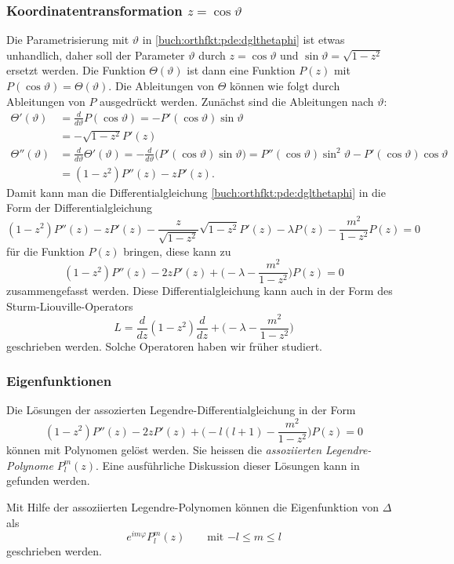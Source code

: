 \subsubsection{Koordinatentransformation $z=\cos\vartheta$}
Die Parametrisierung mit $\vartheta$
in \eqref{buch:orthfkt:pde:dglthetaphi}
ist etwas unhandlich, daher soll der Parameter
$\vartheta$ durch $z=\cos\vartheta$ und
$\sin\vartheta = \!\sqrt{1-z^2}$
ersetzt werden.
Die Funktion $\Theta(\vartheta)$ ist dann eine Funktion $P(z)$ mit
$P(\cos\vartheta)=\Theta(\vartheta)$.
Die Ableitungen von $\Theta$ können wie folgt
durch Ableitungen von $P$ ausgedrückt werden.
Zunächst sind die Ableitungen nach $\vartheta$:
\begin{align*}
\Theta'(\vartheta)
&=
\frac{d}{d\vartheta} P(\cos\vartheta)
=
-P'(\cos\vartheta) \sin\vartheta
\\
&=
-
\!\sqrt{1-z^2}
P'(z)
\\
\Theta''(\vartheta)
&=
\frac{d}{d\vartheta} 
\Theta'(\vartheta)
=
-\frac{d}{d\vartheta}\bigl(P'(\cos\vartheta) \sin\vartheta\bigr)
=
P''(\cos\vartheta)\sin^2\vartheta
-
P'(\cos\vartheta)\cos\vartheta
\\
&=
(1-z^2)
P''(z)
-
z
P'(z).
\end{align*}
Damit kann man die Differentialgleichung
\eqref{buch:orthfkt:pde:dglthetaphi}
in die Form der Differentialgleichung
\[
(1-z^2)P''(z)
-
zP'(z)
-
\frac{z}{\!\sqrt{1-z^2}}\!\sqrt{1-z^2}P'(z)
-
\lambda P(z)
-
\frac{m^2}{1-z^2}P(z)
=
0
\]
für die Funktion $P(z)$ bringen, diese kann zu
\begin{equation}
(1-z^2)P''(z) - 2zP'(z)
+
\biggl(
-
\lambda
-
\frac{m^2}{1-z^2}
\biggr)
P(z)
=
0
\label{buch:orthofkt:pde:eqn:legendreassocz}
\end{equation}
zusammengefasst werden.
Diese Differentialgleichung kann auch in der Form des
Sturm-Liouville-Operators
\[
L
=
\frac{d}{dz}
(1-z^2)
\frac{d}{dz}
+
\biggl(-\lambda-\frac{m^2}{1-z^2}\biggr)
\]
geschrieben werden.
Solche Operatoren haben wir früher studiert.

%
%
\subsubsection{Eigenfunktionen}
Die Lösungen der assozierten Legendre-Differentialgleichung
in der Form 
\[
(1-z^2)P''(z)
-2z P'(z) +
\biggl(
-l(l+1)-\frac{m^2}{1-z^2}
\biggr)P(z)
=
0
\]
können mit Polynomen gelöst werden.
Sie heissen die {\em assoziierten Legendre-Polynome} $P_l^m(z)$.
Eine ausführliche Diskussion dieser Lösungen kann in
\cite[Kapitel 24]{buch:mathsem-spezfunk}
gefunden werden.

Mit Hilfe der assoziierten Legendre-Polynomen können die Eigenfunktion
von $\Delta$ als
\[
e^{im\varphi}
P_l^m(z)
\qquad\text{mit $-l\le m\le l$}
\]
geschrieben werden.



